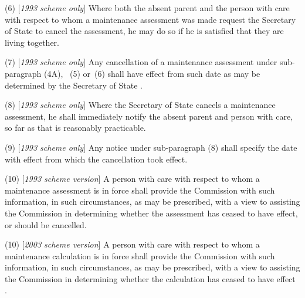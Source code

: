 \documentclass[12pt,a4paper]{article}
\begin{document}
(6) [\emph{1993 scheme only}] Where both the absent parent and the person with care with respect to whom a maintenance assessment was made request 
the Secretary of State  %
to cancel the assessment, he may do so if he is satisfied that they are living together.

(7) [\emph{1993 scheme only}] Any cancellation of a maintenance assessment under sub-paragraph 
(4A),~%
(5)  or~(6)  shall have effect from such date as may be determined by 
the Secretary of State%
.

(8) [\emph{1993 scheme only}] Where 
the Secretary of State  %
cancels a maintenance assessment, he shall immediately notify the absent parent and person with care, so far as that is reasonably practicable.

(9) [\emph{1993 scheme only}] Any notice under sub-paragraph (8)  shall specify the date with effect from which the cancellation took effect.

(10) [\emph{1993 scheme version}] A person with care with respect to whom a maintenance assessment is in force shall provide the 
Commission  %
with such information, in such circumstances, as may be prescribed, with a view to assisting the 
Commission  %
in determining whether the assessment has ceased to have effect, or should be cancelled.

(10) [\emph{2003 scheme version}] A person with care with respect to whom a 
maintenance calculation  %
is in force shall provide the 
Commission  %
with such information, in such circumstances, as may be prescribed, with a view to assisting the 
Commission  %
in determining whether the 
calculation  %
has ceased to have effect%
.
\end{document}
